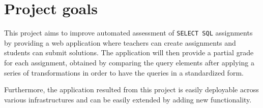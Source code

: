 \section{Project goals}

This project aims to improve automated assessment of \texttt{SELECT SQL} assignments
by providing a web application where teachers can create assignments and students can
submit solutions. The application will then provide a partial grade for each assignment,
obtained by comparing the query elements after applying a series of transformations in order
to have the queries in a standardized form.

Furthermore, the application resulted from this project is easily deployable across
various infrastructures and can be easily extended by adding new functionality.
